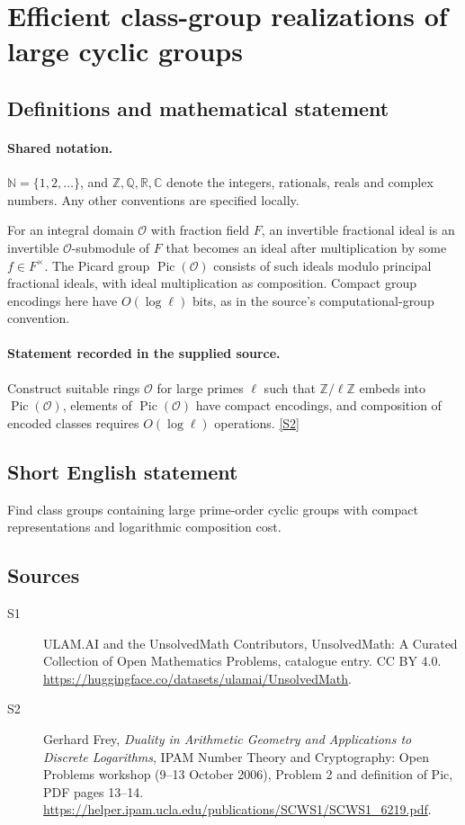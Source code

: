\documentclass[11pt]{article}
\newcommand{\sref}[2]{\hyperlink{source:#1:#2}{[S#2]}}
\begin{document}
\section{Efficient class-group realizations of large cyclic groups}\label{statement}

\subsection{Definitions and mathematical statement}

\paragraph{Shared notation.}$\mathbb N=\{1,2,\ldots\}$, and $\mathbb Z,\mathbb Q,\mathbb R,\mathbb C$ denote the integers, rationals, reals and complex numbers. Any other conventions are specified locally.


For an integral domain $\mathcal O$ with fraction field $F$, an invertible fractional ideal is an invertible $\mathcal O$-submodule of $F$ that becomes an ideal after multiplication by some $f\in F^\times$. The Picard group $\operatorname{Pic}(\mathcal O)$ consists of such ideals modulo principal fractional ideals, with ideal multiplication as composition. Compact group encodings here have $O(\log\ell)$ bits, as in the source's computational-group convention.
\paragraph{Statement recorded in the supplied source.}
Construct suitable rings $\mathcal O$ for large primes $\ell$ such that $\mathbb Z/\ell\mathbb Z$ embeds into $\operatorname{Pic}(\mathcal O)$, elements of $\operatorname{Pic}(\mathcal O)$ have compact encodings, and composition of encoded classes requires $O(\log\ell)$ operations. \sref{statement}{2}

\subsection{Short English statement}
Find class groups containing large prime-order cyclic groups with compact representations and logarithmic composition cost.
\subsection{Sources}
\begin{description}
\item[\hypertarget{source:statement:1}{S1}] ULAM.AI and the UnsolvedMath Contributors, UnsolvedMath: A Curated Collection of Open Mathematics Problems, catalogue entry. CC BY 4.0. \url{https://huggingface.co/datasets/ulamai/UnsolvedMath}.
\item[\hypertarget{source:statement:2}{S2}] Gerhard Frey, \emph{Duality in Arithmetic Geometry and Applications to Discrete Logarithms}, IPAM Number Theory and Cryptography: Open Problems workshop (9--13 October 2006), Problem 2 and definition of Pic, PDF pages 13--14. \url{https://helper.ipam.ucla.edu/publications/SCWS1/SCWS1_6219.pdf}.
\end{description}
\label{end:statement}
\end{document}
